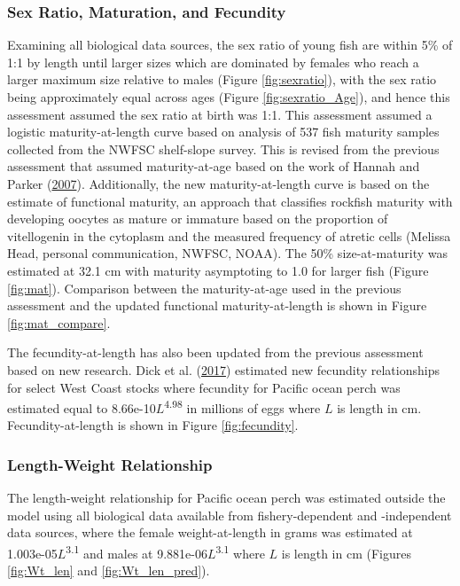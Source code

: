 \documentclass[12pt,]{article}
\begin{document}
\subsubsection{Sex Ratio, Maturation, and
Fecundity}\label{sex-ratio-maturation-and-fecundity}

Examining all biological data sources, the sex ratio of young fish are
within 5\% of 1:1 by length until larger sizes which are dominated by
females who reach a larger maximum size relative to males (Figure
\ref{fig:sexratio}), with the sex ratio being approximately equal across
ages (Figure \ref{fig:sexratio_Age}), and hence this assessment assumed
the sex ratio at birth was 1:1. This assessment assumed a logistic
maturity-at-length curve based on analysis of 537 fish maturity samples
collected from the NWFSC shelf-slope survey. This is revised from the
previous assessment that assumed maturity-at-age based on the work of
Hannah and Parker
(\protect\hyperlink{ref-hannah_age-modulated_2007}{2007}). Additionally,
the new maturity-at-length curve is based on the estimate of functional
maturity, an approach that classifies rockfish maturity with developing
oocytes as mature or immature based on the proportion of vitellogenin in
the cytoplasm and the measured frequency of atretic cells (Melissa Head,
personal communication, NWFSC, NOAA). The 50\% size-at-maturity was
estimated at 32.1 cm with maturity asymptoting to 1.0 for larger fish
(Figure \ref{fig:mat}). Comparison between the maturity-at-age used in
the previous assessment and the updated functional maturity-at-length is
shown in Figure \ref{fig:mat_compare}.

The fecundity-at-length has also been updated from the previous
assessment based on new research. Dick et al.
(\protect\hyperlink{ref-dick_meta-analysis_2017}{2017}) estimated new
fecundity relationships for select West Coast stocks where fecundity for
Pacific ocean perch was estimated equal to
8.66e-10\(L\)\textsuperscript{4.98} in millions of eggs where \(L\) is
length in cm. Fecundity-at-length is shown in Figure
\ref{fig:fecundity}.

\subsubsection{Length-Weight
Relationship}\label{length-weight-relationship}

The length-weight relationship for Pacific ocean perch was estimated
outside the model using all biological data available from
fishery-dependent and -independent data sources, where the female
weight-at-length in grams was estimated at
1.003e-05\(L\)\textsuperscript{3.1} and males at
9.881e-06\(L\)\textsuperscript{3.1} where \(L\) is length in cm (Figures
\ref{fig:Wt_len} and \ref{fig:Wt_len_pred}).
\end{document}
